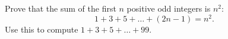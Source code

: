Prove that the sum of the first $n$ positive odd integers is $n^2$:
\[
1+3+5+\dots+(2n-1)=n^2 .
\]
Use this to compute $1+3+5+\dots+99$.
